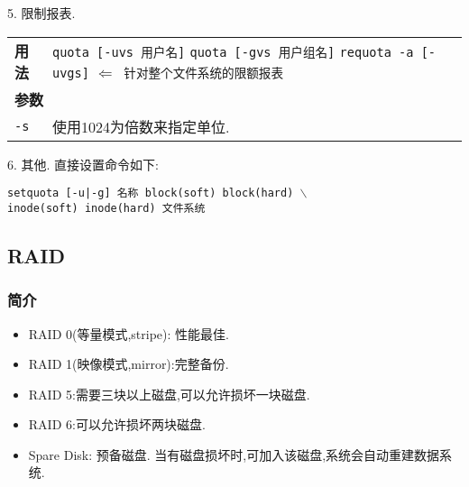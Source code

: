 \par
5. 限制报表.
\begin{longtable}{l@{ : }p{}}\hline\hline

    \textbf{用法} & \verb"quota [-uvs 用户名]" \newline
                    \verb"quota [-gvs 用户组名]"  \newline
                    \verb"requota -a [-uvgs]" \texttt{$\Longleftarrow$ 针对整个文件系统的限额报表}\\
    \multicolumn{2}{l}{\bfseries 参数}\\

    \texttt{-s} & 使用1024为倍数来指定单位.\\

    \hline
\end{longtable}

\par
6. 其他. 直接设置命令如下:\\
\parbox{\textwidth}{\qquad \texttt{setquota [-u|-g] 名称 block(soft) block(hard) $\backslash$ \\ inode(soft) inode(hard) 文件系统}}


\subsection{RAID}
\subsubsection{简介}
\begin{itemize}
\item RAID 0(等量模式,stripe): 性能最佳.

\item RAID 1(映像模式,mirror):完整备份.

\item RAID 5:需要三块以上磁盘,可以允许损坏一块磁盘.

\item RAID 6:可以允许损坏两块磁盘.

\item Spare Disk: 预备磁盘. 当有磁盘损坏时,可加入该磁盘,系统会自动重建数据系统.
\end{itemize}


